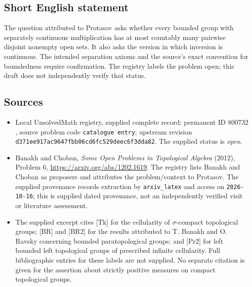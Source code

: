 \documentclass[11pt]{article}
\begin{document}
\subsection{Short English statement}
The question attributed to Protasov asks whether every bounded group with separately continuous multiplication has at most countably many pairwise disjoint nonempty open sets. It also asks the version in which inversion is continuous. The intended separation axioms and the source's exact convention for boundedness require confirmation. The registry labels the problem open; this draft does not independently verify that status.
\subsection{Sources}
\begin{itemize}
\item Local UnsolvedMath registry, supplied complete record: permanent ID \(800732\), source problem code \texttt{catalogue entry}; upstream revision \texttt{d371ee917ac9647fbb06cd6fc529deec6f3dda82}. The supplied status is \emph{open}.
\item Banakh and Choban, \emph{Some Open Problems in Topological Algebra} (2012), Problem 6, \url{https://arxiv.org/abs/1202.1619}. The registry lists Banakh and Choban as proposers and attributes the problem/context to Protasov. The supplied provenance records extraction by \texttt{arxiv\_latex} and access on \texttt{2026-10-16}; this is supplied dated provenance, not an independently verified visit or literature assessment.
\item The supplied excerpt cites [Tk] for the cellularity of \(\sigma\)-compact topological groups; [BR] and [BR2] for the results attributed to T. Banakh and O. Ravsky concerning bounded paratopological groups; and [Pr2] for left bounded left topological groups of prescribed infinite cellularity. Full bibliographic entries for these labels are not supplied. No separate citation is given for the assertion about strictly positive measures on compact topological groups.
\end{itemize}
\end{document}
